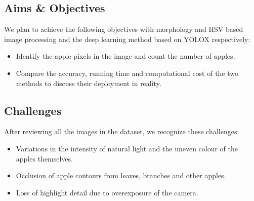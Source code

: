 \subsection{Aims \& Objectives}
We plan to achieve the following objectives with morphology and HSV based image processing and the deep learning method based on YOLOX respectively:
\begin{itemize}
    \item Identify the apple pixels in the image and count the number of apples,
    \item Compare the accuracy, running time and computational cost of the two methods to discuss their deployment in reality.
\end{itemize}

\subsection{Challenges}
After reviewing all the images in the dataset, we recognize these challenges:
\begin{itemize}
    \item Variations in the intensity of natural light and the uneven colour of the apples themselves.
    \item Occlusion of apple contours from leaves, branches and other apples.
    \item Loss of highlight detail due to overexposure of the camera.
\end{itemize}


